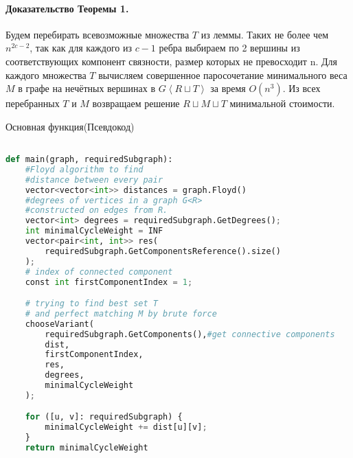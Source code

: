 \paragraph{Доказательство Теоремы 1.}

Будем перебирать всевозможные множества $T$ из леммы. Таких не более чем $n^{2c-2}$, так как для каждого из $c-1$ ребра выбираем по 2 вершины из соответствующих компонент связности, размер которых не превосходит n. Для каждого множества $T$ вычисляем совершенное паросочетание минимального веса $M$ в графе на нечётных вершинах в $G \left\langle R \sqcup T \right\rangle$ за время $O(n^3)$. Из всех перебранных $T$ и $M$ возвращаем решение $R \sqcup M \sqcup T$ минимальной стоимости.



\begin{algorithm}
\caption{Основная функция(Псевдокод)}\label{alg:cap}
\begin{lstlisting}[language=Python]

def main(graph, requiredSubgraph):
    #Floyd algorithm to find 
    #distance between every pair
    vector<vector<int>> distances = graph.Floyd()
    #degrees of vertices in a graph G<R> 
    #constructed on edges from R.
    vector<int> degrees = requiredSubgraph.GetDegrees(); 
    int minimalCycleWeight = INF
    vector<pair<int, int>> res(
        requiredSubgraph.GetComponentsReference().size()
    );
    # index of connected component 
    const int firstComponentIndex = 1; 

    # trying to find best set T 
    # and perfect matching M by brute force
    chooseVariant(
        requiredSubgraph.GetComponents(),#get connective components  
        dist, 
        firstComponentIndex, 
        res, 
        degrees, 
        minimalCycleWeight
    );

    for ([u, v]: requiredSubgraph) {
        minimalCycleWeight += dist[u][v];
    }
    return minimalCycleWeight
\end{lstlisting}

\end{algorithm}


